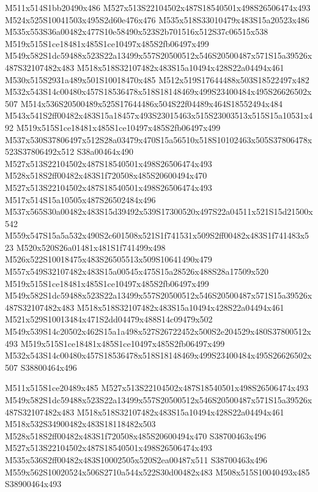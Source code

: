 \documentclass{article}
\begin{document}
\begin{multicols}{2}
M511x514S1bb20490x486 M527x513S22104502x487S18540501x498S26506474x493 M524x525S10041503x495S2d60e476x476 M535x518S33010479x483S15a20523x486 M535x553S36a00482x477S10e58490x523S2b701516x512S37c06515x538 M519x515S1ce18481x485S1ce10497x485S2fb06497x499 M549x582S1dc59488x523S22a13499x557S20500512x546S20500487x571S15a39526x487S32107482x483 M518x518S32107482x483S15a10494x428S22a04494x461 M530x515S2931a489x501S10018470x485 M512x519S17644488x503S18522497x482 M532x543S14c00480x457S18536478x518S18148469x499S23400484x495S26626502x507 M514x536S20500489x525S17644486x504S22f04489x464S18552494x484 M543x541S2ff00482x483S15a18457x493S23015463x515S23003513x515S15a10531x492 M519x515S1ce18481x485S1ce10497x485S2fb06497x499 M537x530S37806497x512S28a03479x470S15a56510x518S10102463x505S37806478x523S37806492x512 S38a00464x490 M527x513S22104502x487S18540501x498S26506474x493 M528x518S2ff00482x483S1f720508x485S20600494x470 M527x513S22104502x487S18540501x498S26506474x493 M517x514S15a10505x487S26502484x496 M537x565S30a00482x483S15d39492x539S17300520x497S22a04511x521S15d21500x542 M559x547S15a5a532x490S2c601508x521S1f741531x509S2ff00482x483S1f741483x523 M520x520S26a01481x481S1f741499x498 M526x522S10018475x483S26505513x509S10641490x479 M557x549S32107482x483S15a00545x475S15a28526x488S28a17509x520 M519x515S1ce18481x485S1ce10497x485S2fb06497x499 M549x582S1dc59488x523S22a13499x557S20500512x546S20500487x571S15a39526x487S32107482x483 M518x518S32107482x483S15a10494x428S22a04494x461 M521x529S10013484x471S2dd04479x488S14c09479x502 M549x539S14c20502x462S15a1a498x527S26722452x500S2e204529x480S37800512x493 M519x515S1ce18481x485S1ce10497x485S2fb06497x499 M532x543S14c00480x457S18536478x518S18148469x499S23400484x495S26626502x507 S38800464x496

M511x515S1ce20489x485 M527x513S22104502x487S18540501x498S26506474x493 M549x582S1dc59488x523S22a13499x557S20500512x546S20500487x571S15a39526x487S32107482x483 M518x518S32107482x483S15a10494x428S22a04494x461 M518x532S34900482x483S18118482x503 M528x518S2ff00482x483S1f720508x485S20600494x470 S38700463x496 M527x513S22104502x487S18540501x498S26506474x493 M535x536S2ff00482x483S10002505x520S2ea00487x511 S38700463x496 M559x562S10020524x506S2710a544x522S30d00482x483 M508x515S10040493x485 S38900464x493


\end{multicols}
\end{document}
